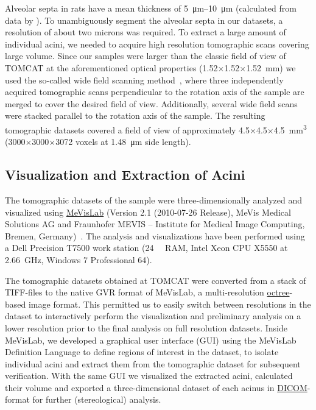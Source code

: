 \documentclass[a4paper,DIV=calc,abstract,english]{scrartcl}
\begin{document}
Alveolar septa in rats have a mean thickness of \SIrange{5}{10}{\micro\meter} (calculated from data by \citet{Burri1974}).
To unambiguously segment the alveolar septa in our datasets, a resolution of  about two microns was required.
To extract a large amount of individual acini, we needed to acquire high resolution tomographic scans covering large volume.
Since our samples were larger than the classic field of view of TOMCAT at the aforementioned optical properties (1.52\(\times\)1.52\(\times\)\SI{1.52}{\milli\meter}) we used the so-called wide field scanning method~\cite{Haberthuer2010a}, where three independently acquired tomographic scans perpendicular to the rotation axis of the sample are merged to cover the desired field of view.
Additionally, several wide field scans were stacked parallel to the rotation axis of the sample.
The resulting tomographic datasets covered a field of view of approximately 4.5\(\times\)4.5\(\times\)\SI{4.5}{\milli\meter\cubed} (3000\(\times\)3000\(\times\)3072 voxels at \SI{1.48}{\micro\meter} side length).

\subsection{Visualization and Extraction of Acini}
The tomographic datasets of the sample were three-dimensionally analyzed and visualized using \href{http://mevislab.de}{MeVisLab} (Version 2.1 (2010-07-26 Release), MeVis Medical Solutions AG and Fraunhofer MEVIS -- Institute for Medical Image Computing, Bremen, Germany)~\cite{Bitter2007}.
The analysis and visualizations have been performed using a Dell Precision T7500 work station (\SI{24}{\giga\byte} RAM, Intel Xeon CPU X5550 at \SI{2.66}{\giga\hertz}, Windows 7 Professional \SI{64}{\bit}).

The tomographic datasets obtained at TOMCAT were converted from a stack of TIFF-files to the native GVR format of MeVisLab, a multi-resolution \href{https://secure.wikimedia.org/wikipedia/en/w/index.php?title=Octree&oldid=409131920}{octree}-based image format.
This permitted us to easily switch between resolutions in the dataset to interactively perform the visualization and preliminary analysis on a lower resolution prior to the final analysis on full resolution datasets.
Inside MeVisLab, we developed a graphical user interface (GUI) using the MeVisLab Definition Language to define regions of interest in the dataset, to isolate individual acini and extract them from the tomographic dataset for subsequent verification.
With the same GUI we visualized the extracted acini, calculated their volume and exported a three-dimensional dataset of each acinus in \href{http://en.wikipedia.org/w/index.php?title=DICOM&oldid=511155074}{DICOM}-format for further (stereological) analysis.
\end{document}
